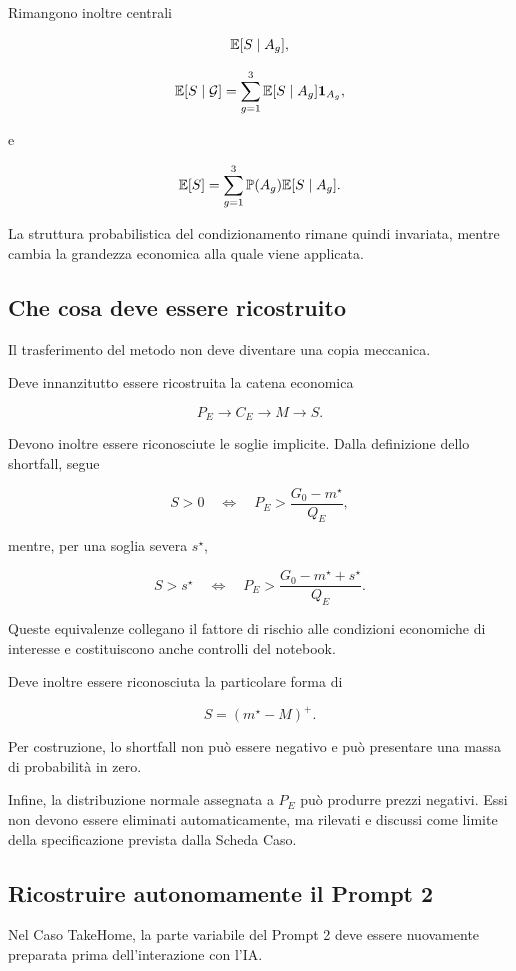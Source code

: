 Rimangono inoltre centrali

\[
\mathbb{E}[S\mid A_g],
\]

\[
\mathbb{E}[S\mid\mathcal{G}]
=
\sum_{g=1}^{3}
\mathbb{E}[S\mid A_g]\mathbf{1}_{A_g},
\]

\noindent e

\[
\mathbb{E}[S]
=
\sum_{g=1}^{3}
\mathbb{P}(A_g)\mathbb{E}[S\mid A_g].
\]

La struttura probabilistica del condizionamento rimane quindi invariata,
mentre cambia la grandezza economica alla quale viene applicata.

\subsection{Che cosa deve essere ricostruito}

Il trasferimento del metodo non deve diventare una copia meccanica.

Deve innanzitutto essere ricostruita la catena economica

\[
P_E
\longrightarrow
C_E
\longrightarrow
M
\longrightarrow
S.
\]

Devono inoltre essere riconosciute le soglie implicite. Dalla definizione dello
shortfall, segue

\[
S>0
\quad\Longleftrightarrow\quad
P_E>
\frac{G_0-m^\star}{Q_E},
\]

\noindent mentre, per una soglia severa $s^\star$,

\[
S>s^\star
\quad\Longleftrightarrow\quad
P_E>
\frac{G_0-m^\star+s^\star}{Q_E}.
\]

Queste equivalenze collegano il fattore di rischio alle condizioni economiche
di interesse e costituiscono anche controlli del notebook.

Deve inoltre essere riconosciuta la particolare forma di

\[
S=(m^\star-M)^+.
\]

Per costruzione, lo shortfall non pu\`{o} essere negativo e pu\`{o} presentare
una massa di probabilit\`{a} in zero.

Infine, la distribuzione normale assegnata a $P_E$ pu\`{o} produrre prezzi
negativi. Essi non devono essere eliminati automaticamente, ma rilevati e
discussi come limite della specificazione prevista dalla Scheda Caso.

\subsection{Ricostruire autonomamente il Prompt 2}

Nel Caso TakeHome, la parte variabile del Prompt 2 deve essere nuovamente
preparata prima dell'interazione con l'IA.

